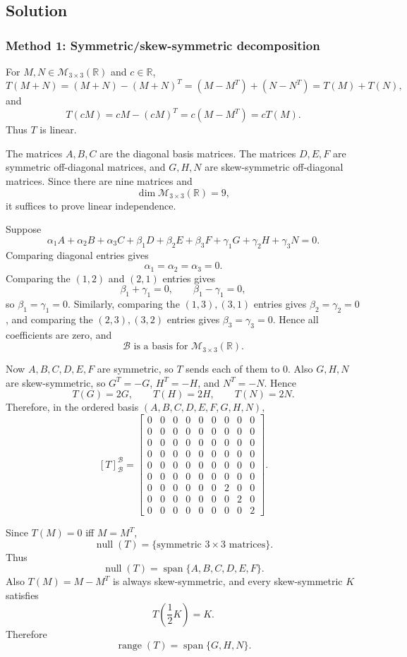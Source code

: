 \documentclass[12pt]{article}
\newcommand{\R}{\mathbb{R}}
\newcommand{\M}{\mathcal{M}}
\newcommand{\B}{\mathcal{B}}
\newcommand{\Null}{\operatorname{null}}
\newcommand{\Range}{\operatorname{range}}
\newcommand{\Span}{\operatorname{span}}
\begin{document}
\subsection{Solution}

\subsubsection{Method 1: Symmetric/skew-symmetric decomposition}
For $M,N\in\M_{3\times3}(\R)$ and $c\in\R$,
\[
T(M+N)=(M+N)-(M+N)^T=(M-M^T)+(N-N^T)=T(M)+T(N),
\]
and
\[
T(cM)=cM-(cM)^T=c(M-M^T)=cT(M).
\]
Thus $T$ is linear.

The matrices $A,B,C$ are the diagonal basis matrices. The matrices $D,E,F$ are symmetric off-diagonal matrices, and $G,H,N$ are skew-symmetric off-diagonal matrices. Since there are nine matrices and
\[
\dim\M_{3\times3}(\R)=9,
\]
it suffices to prove linear independence.

Suppose
\[
\alpha_1A+\alpha_2B+\alpha_3C+\beta_1D+\beta_2E+\beta_3F+\gamma_1G+\gamma_2H+\gamma_3N=0.
\]
Comparing diagonal entries gives
\[
\alpha_1=\alpha_2=\alpha_3=0.
\]
Comparing the $(1,2)$ and $(2,1)$ entries gives
\[
\beta_1+
\gamma_1=0,
\qquad
\beta_1-\gamma_1=0,
\]
so $\beta_1=\gamma_1=0$. Similarly, comparing the $(1,3),(3,1)$ entries gives $\beta_2=\gamma_2=0$, and comparing the $(2,3),(3,2)$ entries gives $\beta_3=\gamma_3=0$. Hence all coefficients are zero, and
\[
\boxed{\B\text{ is a basis for }\M_{3\times3}(\R).}
\]

Now $A,B,C,D,E,F$ are symmetric, so $T$ sends each of them to $0$. Also $G,H,N$ are skew-symmetric, so $G^T=-G$, $H^T=-H$, and $N^T=-N$. Hence
\[
T(G)=2G,
\qquad
T(H)=2H,
\qquad
T(N)=2N.
\]
Therefore, in the ordered basis $(A,B,C,D,E,F,G,H,N)$,
\[
\boxed{
[T]_{\B}^{\B}=\begin{bmatrix}
0&0&0&0&0&0&0&0&0\\
0&0&0&0&0&0&0&0&0\\
0&0&0&0&0&0&0&0&0\\
0&0&0&0&0&0&0&0&0\\
0&0&0&0&0&0&0&0&0\\
0&0&0&0&0&0&0&0&0\\
0&0&0&0&0&0&2&0&0\\
0&0&0&0&0&0&0&2&0\\
0&0&0&0&0&0&0&0&2
\end{bmatrix}.}
\]

Since $T(M)=0$ iff $M=M^T$,
\[
\Null(T)=\{\text{symmetric }3\times3\text{ matrices}\}.
\]
Thus
\[
\boxed{\Null(T)=\Span\{A,B,C,D,E,F\}.}
\]
Also $T(M)=M-M^T$ is always skew-symmetric, and every skew-symmetric $K$ satisfies
\[
T\left(\frac12K\right)=K.
\]
Therefore
\[
\boxed{\Range(T)=\Span\{G,H,N\}.}
\]
\end{document}
